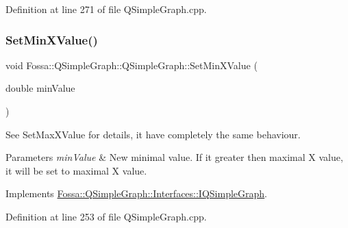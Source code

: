 Definition at line 271 of file Q\+Simple\+Graph.\+cpp.

\mbox{\label{class_fossa_1_1_q_simple_graph_1_1_q_simple_graph_a0eef21e58d8c85f6083d73857f871639}} 
\subsubsection{\texorpdfstring{Set\+Min\+X\+Value()}{SetMinXValue()}}
{\footnotesize\ttfamily void Fossa\+::\+Q\+Simple\+Graph\+::\+Q\+Simple\+Graph\+::\+Set\+Min\+X\+Value (\begin{DoxyParamCaption}\item[{double}]{min\+Value }\end{DoxyParamCaption})\hspace{0.3cm}{\ttfamily [virtual]}}



See Set\+Max\+X\+Value for details, it have completely the same behaviour. 


\begin{DoxyParams}{Parameters}
{\em min\+Value} & New minimal value. If it greater then maximal X value, it will be set to maximal X value. \\
\hline
\end{DoxyParams}


Implements \hyperlink{class_fossa_1_1_q_simple_graph_1_1_interfaces_1_1_i_q_simple_graph_a4266725f87b306e572ad1ae37cfab4ef}{Fossa\+::\+Q\+Simple\+Graph\+::\+Interfaces\+::\+I\+Q\+Simple\+Graph}.



Definition at line 253 of file Q\+Simple\+Graph.\+cpp.

\mbox{\label{class_fossa_1_1_q_simple_graph_1_1_q_simple_graph_a8bf9aac5856a659eb89abffca7750df0}} 
